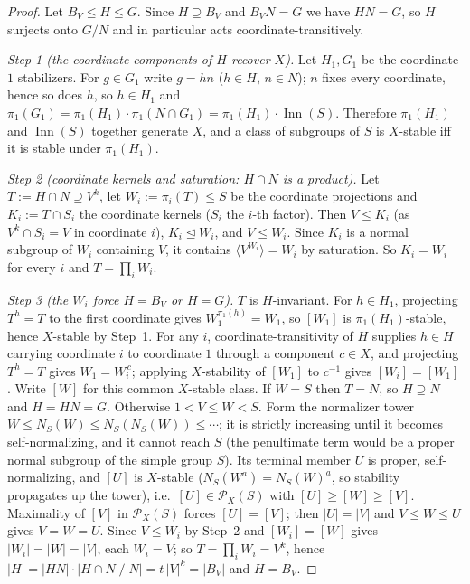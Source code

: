 \documentclass[11pt]{amsart}
\theoremstyle{definition}
\theoremstyle{remark}
\DeclareMathOperator{\Inn}{Inn}
\newcommand{\Pos}{\mathcal{P}}
\begin{document}
\begin{proof}
Let $B_V\leq H\leq G$. Since $H\supseteq B_V$ and $B_VN=G$ we have
$HN=G$, so $H$ surjects onto $G/N$ and in particular acts
coordinate-transitively.

\emph{Step 1 (the coordinate components of $H$ recover $X$).} Let $H_1,G_1$ be the
coordinate-$1$ stabilizers. For $g\in G_1$ write $g=hn$ ($h\in H$,
$n\in N$); $n$ fixes every coordinate, hence so does $h$, so $h\in H_1$
and $\pi_1(G_1)=\pi_1(H_1)\cdot\pi_1(N\cap G_1)=\pi_1(H_1)\cdot\Inn(S)$.
Therefore $\pi_1(H_1)$ and $\Inn(S)$ together generate $X$, and a class
of subgroups of $S$ is $X$-stable iff it is stable under $\pi_1(H_1)$.

\emph{Step 2 (coordinate kernels and saturation: $H\cap N$ is a product).} Let
$T:=H\cap N\supseteq V^k$, let $W_i:=\pi_i(T)\leq S$ be the coordinate
projections and $K_i:=T\cap S_i$ the coordinate kernels ($S_i$ the $i$-th
factor). Then $V\leq K_i$ (as $V^k\cap S_i=V$ in coordinate $i$),
$K_i\trianglelefteq W_i$, and $V\leq W_i$. Since $K_i$ is a normal
subgroup of $W_i$ containing $V$, it contains
$\langle V^{W_i}\rangle=W_i$ by saturation. So $K_i=W_i$ for every $i$
and $T=\prod_i W_i$.

\emph{Step 3 (the $W_i$ force $H=B_V$ or $H=G$).} $T$ is $H$-invariant.
For $h\in H_1$, projecting $T^h=T$ to the first coordinate gives
$W_1^{\pi_1(h)}=W_1$, so $[W_1]$ is $\pi_1(H_1)$-stable, hence
$X$-stable by Step~1. For any $i$, coordinate-transitivity of $H$
supplies $h\in H$ carrying coordinate $i$ to coordinate $1$ through a
component $c\in X$, and projecting $T^h=T$ gives $W_1=W_i^{\,c}$;
applying $X$-stability of $[W_1]$ to $c^{-1}$ gives $[W_i]=[W_1]$.
Write $[W]$ for this common $X$-stable class.
If $W=S$ then $T=N$, so $H\supseteq N$ and $H=HN=G$.
Otherwise $1<V\leq W<S$. Form the normalizer tower
$W\leq N_S(W)\leq N_S(N_S(W))\leq\cdots$; it is strictly increasing
until it becomes self-normalizing, and it cannot reach $S$ (the
penultimate term would be a proper normal subgroup of the simple group
$S$). Its terminal member $U$ is proper, self-normalizing, and $[U]$ is
$X$-stable ($N_S(W^a)=N_S(W)^a$, so stability propagates up the tower),
i.e.\ $[U]\in\Pos_X(S)$ with $[U]\geq[W]\geq[V]$. Maximality of $[V]$ in
$\Pos_X(S)$ forces $[U]=[V]$; then $|U|=|V|$ and $V\leq W\leq U$ gives
$V=W=U$. Since $V\leq W_i$ by Step~2 and $[W_i]=[W]$ gives
$|W_i|=|W|=|V|$, each $W_i=V$; so $T=\prod_i W_i=V^k$, hence
$|H|=|HN|\cdot|H\cap N|/|N|=t\,|V|^k=|B_V|$
and $H=B_V$.
\end{proof}
\end{document}
